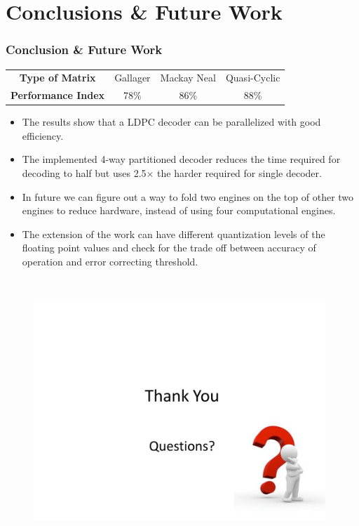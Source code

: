 \documentclass[xcolor=dvipsname]
{beamer}
\begin{document}
\section{Conclusions \& Future Work}
		\begin{frame} 
			\frametitle{Conclusion \& Future Work}
			
\begin{center}
\begin{tabular}{@{}cccc@{}}
\toprule
\textbf{Type of Matrix} & Gallager & Mackay Neal  &  Quasi-Cyclic  \\ 
\textbf{Performance Index} &  78\% & 86\% & 88\% \\ \bottomrule
\end{tabular}
\end{center}


\begin{itemize}
[triangle]
\item The results show that a LDPC decoder can be parallelized with good efficiency.
\item The implemented 4-way partitioned decoder reduces the time required for decoding to half but uses 2.5$\times$ the harder required for single decoder.  
\item In future we can figure out a way to fold two engines on the top of other two engines to reduce hardware, instead of using four computational engines. 
\item The extension of the work can have different quantization levels of the floating point values and check for the trade off between accuracy of operation and error correcting threshold.
\end{itemize}
\end{frame}




\begin{frame}[plain]
\vspace{-20mm}
 			\begin{figure}
			\includegraphics[height=10cm,width=11cm]{end}
			\end{figure}   
\end{frame}	




	
\end{document}
